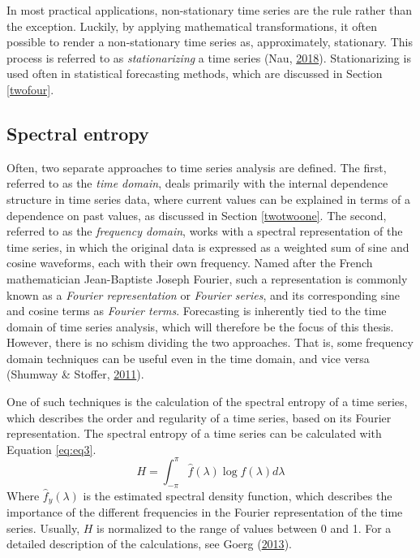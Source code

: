 \documentclass[12pt,oneside]{reedthesis}
\begin{document}
In most practical applications, non-stationary time series are the rule
rather than the exception. Luckily, by applying mathematical
transformations, it often possible to render a non-stationary time
series as, approximately, stationary. This process is referred to as
\emph{stationarizing} a time series (Nau,
\protect\hyperlink{ref-nau2018}{2018}). Stationarizing is used often in
statistical forecasting methods, which are discussed in Section
\ref{twofour}.

\subsection{Spectral entropy}\label{twotwothree}

Often, two separate approaches to time series analysis are defined. The
first, referred to as the \emph{time domain}, deals primarily with the
internal dependence structure in time series data, where current values
can be explained in terms of a dependence on past values, as discussed
in Section \ref{twotwoone}. The second, referred to as the
\emph{frequency domain}, works with a spectral representation of the
time series, in which the original data is expressed as a weighted sum
of sine and cosine waveforms, each with their own frequency. Named after
the French mathematician Jean-Baptiste Joseph Fourier, such a
representation is commonly known as a \emph{Fourier representation} or
\emph{Fourier series}, and its corresponding sine and cosine terms as
\emph{Fourier terms}. Forecasting is inherently tied to the time domain
of time series analysis, which will therefore be the focus of this
thesis. However, there is no schism dividing the two approaches. That
is, some frequency domain techniques can be useful even in the time
domain, and vice versa (Shumway \& Stoffer,
\protect\hyperlink{ref-shumway2011}{2011}).

One of such techniques is the calculation of the spectral entropy of a
time series, which describes the order and regularity of a time series,
based on its Fourier representation. The spectral entropy of a time
series can be calculated with Equation \eqref{eq:eq3}.
\begin{equation}
H = \int_{-\pi}^{\pi} \hat{f}(\lambda)\log \hat{f}(\lambda)d\lambda
\label{eq:eq3}
\end{equation}
Where \(\hat{f}_{y}(\lambda)\) is the estimated spectral density
function, which describes the importance of the different frequencies in
the Fourier representation of the time series. Usually, \(H\) is
normalized to the range of values between 0 and 1. For a detailed
description of the calculations, see Goerg
(\protect\hyperlink{ref-goerg2013}{2013}).
\end{document}
